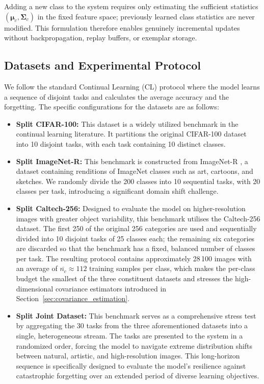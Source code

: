 Adding a new class to the system requires only estimating the sufficient statistics $(\boldsymbol{\mu}_c, \boldsymbol{\Sigma}_c)$ in the fixed feature space; previously learned class statistics are never modified. This formulation therefore enables genuinely incremental updates without backpropagation, replay buffers, or exemplar storage.

\subsection{Datasets and Experimental Protocol}
We follow the standard Continual Learning (CL) protocol where the model learns a sequence of disjoint tasks and calculates the average accuracy and the forgetting. The specific configurations for the datasets are as follows:

\begin{itemize}
	\item \textbf{Split CIFAR-100:} This dataset is a widely utilized benchmark in the continual learning literature. It partitions the original CIFAR-100 \cite{cifar100} dataset into 10 disjoint tasks, with each task containing 10 distinct classes.

	\item \textbf{Split ImageNet-R:} This benchmark is constructed from ImageNet-R \cite{imagenetR}, a dataset containing renditions of ImageNet classes such as art, cartoons, and sketches. We randomly divide the 200 classes into 10 sequential tasks, with 20 classes per task, introducing a significant domain shift challenge.

	\item \textbf{Split Caltech-256:} Designed to evaluate the model on higher-resolution images with greater object variability, this benchmark utilises the Caltech-256 \cite{caltech256} dataset. The first 250 of the original 256 categories are used and sequentially divided into 10 disjoint tasks of 25 classes each; the remaining six categories are discarded so that the benchmark has a fixed, balanced number of classes per task. The resulting protocol contains approximately 28\,100 images with an average of $\overline{n_c}\!\approx\!112$ training samples per class, which makes the per-class budget the smallest of the three constituent datasets and stresses the high-dimensional covariance estimators introduced in Section~\ref{sec:covariance_estimation}.

	\item \textbf{Split Joint Dataset:} This benchmark serves as a comprehensive stress test by aggregating the 30 tasks from the three aforementioned datasets into a single, heterogeneous stream. The tasks are presented to the system in a randomized order, forcing the model to navigate extreme distribution shifts between natural, artistic, and high-resolution images. This long-horizon sequence is specifically designed to evaluate the model's resilience against catastrophic forgetting over an extended period of diverse learning objectives.
\end{itemize}

